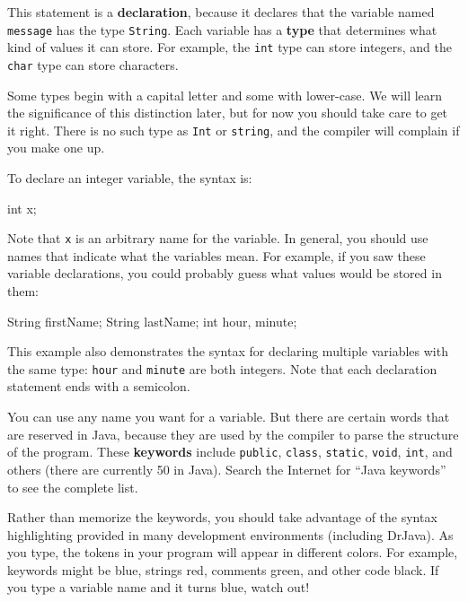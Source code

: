 \documentclass[12pt]{book}
\theoremstyle{exercise}
\newcommand{\java}[1]{\verb"#1"}
\newcommand{\java}[1]{\lstinline{#1}} %
\begin{document}
This statement is a {\bf declaration}, because it declares that the variable named \java{message} has the type \java{String}.
Each variable has a {\bf type} that determines what kind of values it can store.
For example, the \java{int} type can store integers, and the \java{char} type can store characters.

Some types begin with a capital letter and some with lower-case.
We will learn the significance of this distinction later, but for now you should take care to get it right.
There is no such type as \java{Int} or \java{string}, and the compiler will complain if you make one up.

To declare an integer variable, the syntax is:

\begin{code}
    int x;
\end{code}

Note that \java{x} is an arbitrary name for the variable.
In general, you should use names that indicate what the variables mean.
For example, if you saw these variable declarations, you could probably guess what values would be stored in them:

\begin{code}
    String firstName;
    String lastName;
    int hour, minute;
\end{code}

This example also demonstrates the syntax for declaring multiple variables with the same type: \java{hour} and \java{minute} are both integers.
Note that each declaration statement ends with a semicolon.

You can use any name you want for a variable.
But there are certain words that are reserved in Java, because they are used by the compiler to parse the structure of the program.
These {\bf keywords} include \java{public}, \java{class}, \java{static}, \java{void}, \java{int}, and others (there are currently 50 in Java).
Search the Internet for ``Java keywords'' to see the complete list.


Rather than memorize the keywords, you should take advantage of the syntax highlighting provided in many development environments (including DrJava).
As you type, the tokens in your program will appear in different colors.
For example, keywords might be blue, strings red, comments green, and other code black.
If you type a variable name and it turns blue, watch out!
\end{document}
